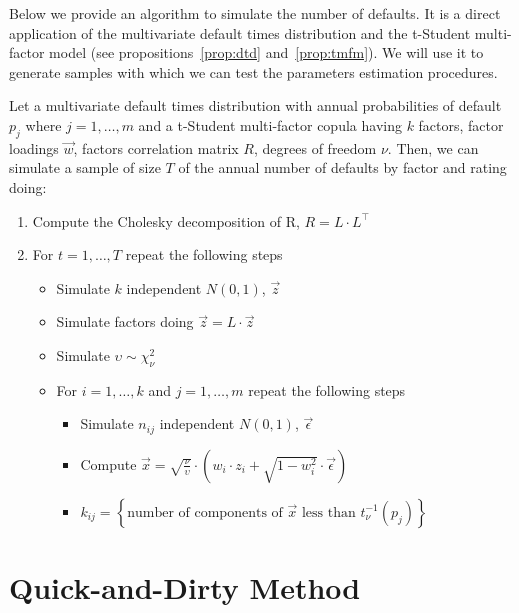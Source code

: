 \documentclass[11pt,fleqn]{book} %
\begin{document}
Below we provide an algorithm to simulate the number of defaults. It is a 
direct application of the multivariate default times distribution and the 
t-Student multi-factor model (see propositions~\ref{prop:dtd} 
and~\ref{prop:tmfm}). We will use it to generate samples with which we can 
test the parameters estimation procedures. 

\begin{algorithm}
	\label{alg:snod}
	Let a multivariate default times distribution with annual probabilities of
	default $p_j$ where $j=1,\dots,m$ and a t-Student multi-factor copula having
	$k$ factors, factor loadings $\vec{w}$, factors correlation matrix $R$, 
	degrees of freedom $\nu$. Then, we can simulate a sample of size $T$ of the 
	annual number of defaults by factor and rating doing:
	\begin{enumerate}
		\item Compute the Cholesky decomposition of R, $R = L \cdot L^\intercal$
		\item For $t=1,\dots,T$ repeat the following steps
		\begin{itemize}
			\item Simulate $k$ independent $N(0,1)$, $\vec{z}$
			\item Simulate factors doing $\vec{z} = L \cdot \vec{z}$
			\item Simulate $\upsilon \sim \chi_{\nu}^2$
			\item For $i=1,\dots,k$ and $j=1,\dots,m$ repeat the following steps
			\begin{itemize}
				\item Simulate $n_{ij}$ independent $N(0,1)$, $\vec{\epsilon}$
				\item Compute $\vec{x} = \sqrt{\frac{\nu}{\upsilon}} \cdot \left( w_i \cdot z_i + \sqrt{1-w_i^2} \cdot \vec{\epsilon} \right)$
				\item $k_{ij} = \left\{ \text{number of components of $\vec{x}$ less than $t_{\nu}^{-1}(p_j)$} \right\} $
			\end{itemize}
		\end{itemize}
	\end{enumerate}
\end{algorithm}

\section{Quick-and-Dirty Method}
\end{document}
